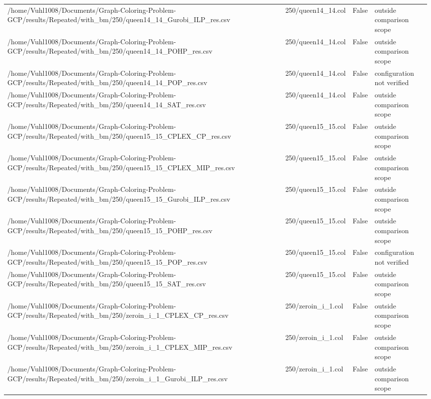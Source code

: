 \begin{table}[htbp]
\begin{tabular}{llll}
/home/Vuhl1008/Documents/Graph-Coloring-Problem-GCP/results/Repeated/with\_bm/250/queen14\_14\_Gurobi\_ILP\_res.csv & 250/queen14\_14.col & False & outside comparison scope \\
/home/Vuhl1008/Documents/Graph-Coloring-Problem-GCP/results/Repeated/with\_bm/250/queen14\_14\_POHP\_res.csv & 250/queen14\_14.col & False & outside comparison scope \\
/home/Vuhl1008/Documents/Graph-Coloring-Problem-GCP/results/Repeated/with\_bm/250/queen14\_14\_POP\_res.csv & 250/queen14\_14.col & False & configuration not verified \\
/home/Vuhl1008/Documents/Graph-Coloring-Problem-GCP/results/Repeated/with\_bm/250/queen14\_14\_SAT\_res.csv & 250/queen14\_14.col & False & outside comparison scope \\
/home/Vuhl1008/Documents/Graph-Coloring-Problem-GCP/results/Repeated/with\_bm/250/queen15\_15\_CPLEX\_CP\_res.csv & 250/queen15\_15.col & False & outside comparison scope \\
/home/Vuhl1008/Documents/Graph-Coloring-Problem-GCP/results/Repeated/with\_bm/250/queen15\_15\_CPLEX\_MIP\_res.csv & 250/queen15\_15.col & False & outside comparison scope \\
/home/Vuhl1008/Documents/Graph-Coloring-Problem-GCP/results/Repeated/with\_bm/250/queen15\_15\_Gurobi\_ILP\_res.csv & 250/queen15\_15.col & False & outside comparison scope \\
/home/Vuhl1008/Documents/Graph-Coloring-Problem-GCP/results/Repeated/with\_bm/250/queen15\_15\_POHP\_res.csv & 250/queen15\_15.col & False & outside comparison scope \\
/home/Vuhl1008/Documents/Graph-Coloring-Problem-GCP/results/Repeated/with\_bm/250/queen15\_15\_POP\_res.csv & 250/queen15\_15.col & False & configuration not verified \\
/home/Vuhl1008/Documents/Graph-Coloring-Problem-GCP/results/Repeated/with\_bm/250/queen15\_15\_SAT\_res.csv & 250/queen15\_15.col & False & outside comparison scope \\
/home/Vuhl1008/Documents/Graph-Coloring-Problem-GCP/results/Repeated/with\_bm/250/zeroin\_i\_1\_CPLEX\_CP\_res.csv & 250/zeroin\_i\_1.col & False & outside comparison scope \\
/home/Vuhl1008/Documents/Graph-Coloring-Problem-GCP/results/Repeated/with\_bm/250/zeroin\_i\_1\_CPLEX\_MIP\_res.csv & 250/zeroin\_i\_1.col & False & outside comparison scope \\
/home/Vuhl1008/Documents/Graph-Coloring-Problem-GCP/results/Repeated/with\_bm/250/zeroin\_i\_1\_Gurobi\_ILP\_res.csv & 250/zeroin\_i\_1.col & False & outside comparison scope \\

\end{tabular}
\end{table}
